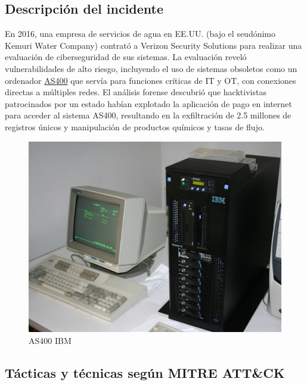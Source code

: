 \subsection{Descripción del incidente}
\begin{paracol}{2}
    \colfill
    En 2016, una empresa de servicios de agua en EE.UU. (bajo el seudónimo Kemuri Water Company) contrató a Verizon Security Solutions para realizar una evaluación de ciberseguridad de sus sistemas. La evaluación reveló vulnerabilidades de alto riesgo, incluyendo el uso de sistemas obsoletos como un ordenador \href{https://it.wikipedia.org/wiki/IBM_AS/400}{AS400} que servía para funciones críticas de IT y OT, con conexiones directas a múltiples redes. El análisis forense descubrió que hacktivistas patrocinados por un estado habían explotado la aplicación de pago en internet para acceder al sistema AS400, resultando en la exfiltración de 2.5 millones de registros únicos y manipulación de productos químicos y tasas de flujo.
    \colfill
    
    \switchcolumn

    \begin{figure}[htbp]
        \centering
        \includegraphics[width=0.95\columnwidth]{images/AS400.jpg}
        \caption{AS400 IBM}
        \label{fig:AS400}
    \end{figure}
\end{paracol}


\subsection{Tácticas y técnicas según MITRE ATT\&CK}

